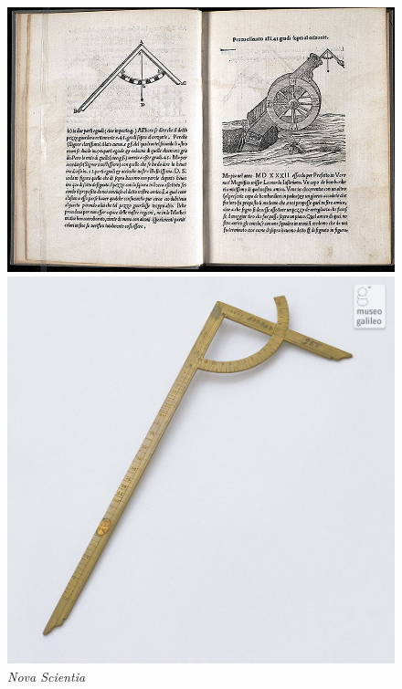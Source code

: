 \documentclass[UTF8]{ctexart}
\begin{document}
\begin{figure}[h]
    \centering
    \begin{minipage}[t]{0.4\textwidth}
        \centering
        \includegraphics[width=1.0\textwidth]{img/Nova_Scientia.jpg}
        \caption{\emph{Nova Scientia}}
        \label{fig:Nova_Scientia}
    \end{minipage}
    \begin{minipage}[t]{0.28\textwidth}
        \centering
        \includegraphics[width=1.0\textwidth]{img/gunners_quadrant_front.jpg}

\end{minipage}
\end{figure}
\end{document}
